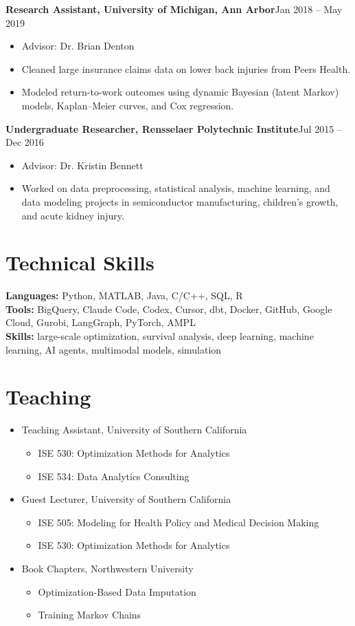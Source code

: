\documentclass[11pt,letterpaper]{article}
\newcommand{\entry}[2]{\textbf{#1}\hfill #2\par}
\begin{document}
\entry{Research Assistant, University of Michigan, Ann Arbor}{Jan 2018 -- May 2019}
\begin{itemize}
  \item Advisor: Dr. Brian Denton
  \item Cleaned large insurance claims data on lower back injuries from Peers Health.
  \item Modeled return-to-work outcomes using dynamic Bayesian (latent Markov) models, Kaplan--Meier curves, and
        Cox regression.
\end{itemize}
\entry{Undergraduate Researcher, Rensselaer Polytechnic Institute}{Jul 2015 -- Dec 2016}
\begin{itemize}
  \item Advisor: Dr. Kristin Bennett
  \item Worked on data preprocessing, statistical analysis, machine learning, and data modeling projects in
        semiconductor manufacturing, children's growth, and acute kidney injury.
\end{itemize}

\section{Technical Skills}
\textbf{Languages:} Python, MATLAB, Java, C/C++, SQL, R\\
\textbf{Tools:} BigQuery, Claude Code, Codex, Cursor, dbt, Docker, GitHub, Google Cloud, Gurobi, LangGraph,
PyTorch, AMPL\\
\textbf{Skills:} large-scale optimization, survival analysis, deep learning, machine learning, AI agents,
multimodal models, simulation

\section{Teaching}
\begin{itemize}
  \item Teaching Assistant, University of Southern California
  \begin{itemize}
    \item ISE 530: Optimization Methods for Analytics
    \item ISE 534: Data Analytics Consulting
  \end{itemize}
  \item Guest Lecturer, University of Southern California
  \begin{itemize}
    \item ISE 505: Modeling for Health Policy and Medical Decision Making
    \item ISE 530: Optimization Methods for Analytics
  \end{itemize}
  \item Book Chapters, Northwestern University
  \begin{itemize}
    \item Optimization-Based Data Imputation
    \item Training Markov Chains
  \end{itemize}
\end{itemize}
\end{document}
